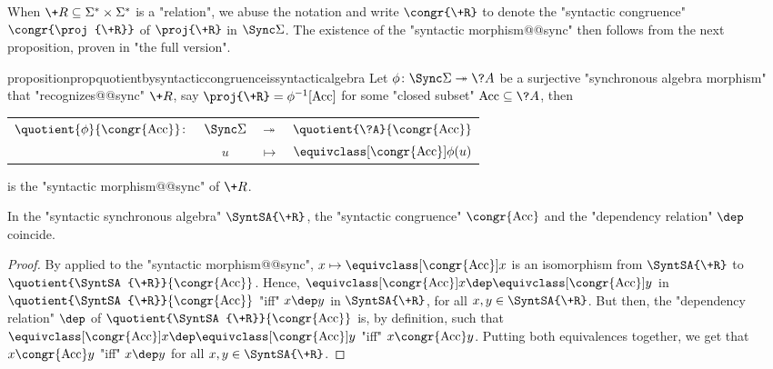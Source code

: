 When $\+R \subseteq \Sigma^* \times\Sigma^*$ is a "relation", we abuse
the notation and write $\congr{\+R}$ to denote
the "syntactic congruence" $\congr{\proj{\+R}}$ of $\proj{\+R}$
in $\Sync\Sigma$.
The existence of the "syntactic morphism@@sync" then follows from
the next proposition, proven in "the full version".

\begin{restatable}{proposition}{propquotientbysyntacticcongruenceissyntacticalgebra}
	\label{prop:quotient-by-syntactic-congruence-is-syntactic-algebra}
	Let $\phi\colon \Sync\Sigma \surj \?A$ be a surjective "synchronous algebra morphism"
	that "recognizes@@sync" $\+R$, say $\proj{\+R} = \phi^{-1}[\Acc]$
	for some "closed subset" $\Acc \subseteq \?A$, then 
	\begin{center}
		\begin{tabular}{rccc}
			$\quotient{\phi}{\congr{\Acc}}\colon$
			& $\Sync\Sigma$
			& $\twoheadrightarrow$
			& $\quotient{\?A}{\congr{\Acc}}$\\
			& $u$
			& $\mapsto$
			& $\equivclass[\congr{\Acc}]{\phi(u)}$
		\end{tabular}		
	\end{center}
	is the "syntactic morphism@@sync" of $\+R$.
\end{restatable}

\begin{corollary}
	\label{coro:syntactic-congruence-is-syntactic-dependency}
	In the "syntactic synchronous algebra" $\SyntSA{\+R}$, the "syntactic
	congruence" $\congr{\Acc}$ and the "dependency relation" $\dep$
	coincide. 
\end{corollary}

\begin{proof}
	By 
	applied to the "syntactic morphism@@sync",
	$x \mapsto \equivclass[\congr{\Acc}]{x}$
	is an isomorphism from $\SyntSA{\+R}$ to $\quotient{\SyntSA{\+R}}{\congr{\Acc}}$.
	Hence, $\equivclass[\congr{\Acc}]{x} \dep \equivclass[\congr{\Acc}]{y}$
	in $\quotient{\SyntSA{\+R}}{\congr{\Acc}}$
	"iff" $x \dep y$ in $\SyntSA{\+R}$, for all $x,y \in \SyntSA{\+R}$.
	But then, the "dependency relation" $\dep$ of
	$\quotient{\SyntSA{\+R}}{\congr{\Acc}}$ is, by definition,
	such that $\equivclass[\congr{\Acc}]{x} \dep \equivclass[\congr{\Acc}]{y}$
	"iff" $x \congr{\Acc} y$.
	Putting both equivalences together, we get that
	$x \congr{\Acc} y$ "iff" $x \dep y$ for all $x,y \in \SyntSA{\+R}$.
\end{proof}

